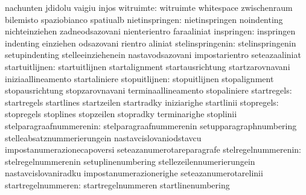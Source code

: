                                   nachunten                        jdidolu
                                  vaigiu                           injos
                       witruimte: witruimte                        whitespace
                                  zwischenraum                     bilemisto
                                  spaziobianco                     spatiualb
                  nietinspringen: nietinspringen                   noindenting
                                  nichteinziehen                   zadneodsazovani
                                  nienterientro                    faraaliniat
                      inspringen: inspringen                       indenting
                                  einziehen                        odsazovani
                                  rientro                          aliniat
                stelinspringenin: stelinspringenin                 setupindenting
                                  stelleeinziehenein               nastavodsazovani
                                  impostarientro                   seteazaaliniat
                  startuitlijnen: startuitlijnen                   startalignment
                                  startausrichtung                 startzarovnavani
                                  iniziaallineamento               startaliniere
                   stopuitlijnen: stopuitlijnen                    stopalignment
                                  stopausrichtung                  stopzarovnavani
                                  terminaallineamento              stopaliniere
                     startregels: startregels                      startlines
                                  startzeilen                      startradky
                                  iniziarighe                      startlinii
                      stopregels: stopregels                       stoplines
                                  stopzeilen                       stopradky
                                  terminarighe                     stoplinii
         stelparagraafnummerenin: stelparagraafnummerenin          setupparagraphnumbering
                                  stelleabsatznummerierungein      nastavcislovaniodstavcu
                                  impostanumerazionecapoversi      seteazanumerotareparagrafe
             stelregelnummerenin: stelregelnummerenin              setuplinenumbering
                                  stellezeilennumerierungein       nastavcislovaniradku
                                  impostanumerazionerighe          seteazanumerotarelinii
              startregelnummeren: startregelnummeren               startlinenumbering
